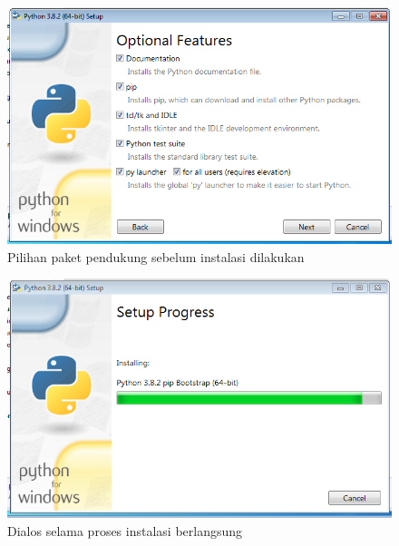\begin{figure}[h!]
  \begin{center}
    \includegraphics[scale=.5]{pics/featureInstall.png}
    \caption{Pilihan paket pendukung sebelum instalasi dilakukan}
    \label{fig:feature}
  \end{center}
\end{figure}

\begin{figure}[h!]
  \begin{center}
    \includegraphics[scale=.5]{pics/installProgress.png}
    \caption{Dialos selama proses instalasi berlangsung}
    \label{fig:installProgres}
  \end{center}
\end{figure}

